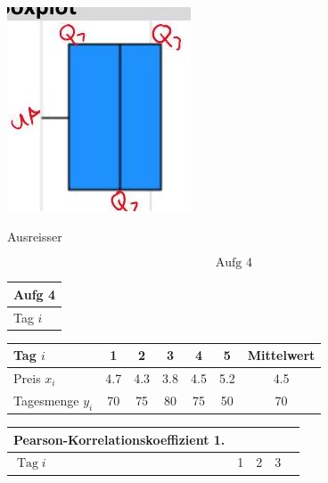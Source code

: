 \documentclass[10pt]{article}
\begin{document}
{\includegraphics[width=\linewidth]{images/2024_12_29_0906b02acf849bda8665g-4(6)}

Ausreisser

$$
\text { Aufg } 4
$$

\begin{center}
\begin{tabular}{|l|}
\hline
Aufg 4 \\
\hline
Tag $i$ \\
\hline
\end{tabular}
\end{center}

\begin{center}
\begin{tabular}{|l|c|c|c|c|c|c|}
\hline
Tag $i$ & 1 & 2 & 3 & 4 & 5 & Mittelwert \\
\hline
Preis $x_{i}$ & 4.7 & 4.3 & 3.8 & 4.5 & 5.2 & 4.5 \\
\hline
Tagesmenge $y_{i}$ & 70 & 75 & 80 & 75 & 50 & 70 \\
\hline
\end{tabular}
\end{center}

\begin{center}
\begin{tabular}{|l|l|l|l|l|}
\hline
Pearson-Korrelationskoeffizient 1. &  &  &  \\
\hline
$\operatorname{Tag} i$ & 1 & 2 & 3 \\
\hline
\end{tabular}
\end{center}

}
\end{document}
